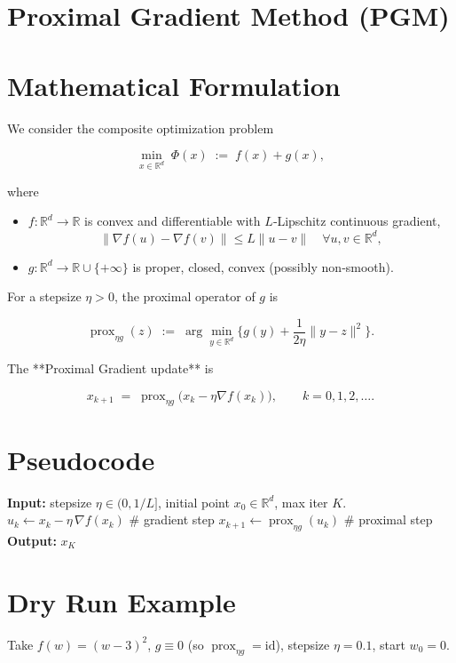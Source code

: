 \documentclass{article}
\newcommand{\prox}{\operatorname{prox}}
\begin{document}
\section*{Proximal Gradient Method (PGM)}

\section*{Mathematical Formulation}
We consider the composite optimization problem  

\[
\min_{x\in\mathbb{R}^{d}} \; \Phi(x)\;:=\; f(x)+g(x),
\tag{1}
\]

where  

\begin{itemize}
  \item $f:\mathbb{R}^{d}\!\to\!\mathbb{R}$ is convex and differentiable with $L$‑Lipschitz continuous gradient,
  \[
      \|\nabla f(u)-\nabla f(v)\|\le L\|u-v\|\quad\forall u,v\in\mathbb{R}^{d},
  \tag{2}
  \]
  \item $g:\mathbb{R}^{d}\!\to\!\mathbb{R}\cup\{+\infty\}$ is proper, closed, convex (possibly non‑smooth).
\end{itemize}

For a stepsize $\eta>0$, the proximal operator of $g$ is  

\[
\prox_{\eta g}(z)\;:=\;\arg\min_{y\in\mathbb{R}^{d}}
\Big\{ g(y)+\frac{1}{2\eta}\|y-z\|^{2}\Big\}.
\tag{3}
\]

The **Proximal Gradient update** is  

\[
x_{k+1}\;=\;\prox_{\eta g}\!\bigl(x_{k}-\eta \nabla f(x_{k})\bigr),
\qquad k=0,1,2,\dots .
\tag{4}
\]

\section*{Pseudocode}
\begin{algorithm}[H]
\caption{Proximal Gradient Method}
\begin{algorithmic}[1]
\STATE \textbf{Input:} stepsize $\eta\in(0,1/L]$, initial point $x_{0}\in\mathbb{R}^{d}$, max iter $K$.
    \STATE $u_{k}\gets x_{k}-\eta\,\nabla f(x_{k})$ \hfill \# gradient step
    \STATE $x_{k+1}\gets \prox_{\eta g}(u_{k})$ \hfill \# proximal step
\ENDFOR
\STATE \textbf{Output:} $x_{K}$
\end{algorithmic}
\end{algorithm}

\section*{Dry Run Example}
Take $f(w)=(w-3)^{2}$, $g\equiv0$ (so $\prox_{\eta g}= \text{id}$), stepsize $\eta=0.1$, start $w_{0}=0$.
\end{document}
